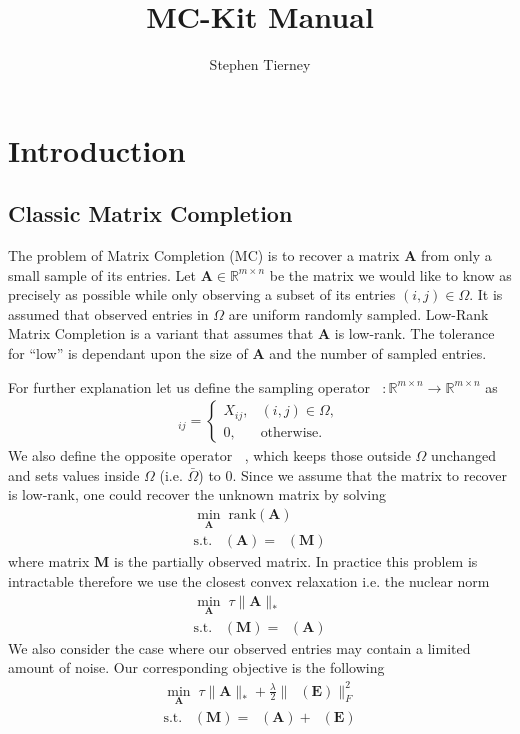 \documentclass{article}
\DeclareMathOperator*{\pro}{\mathcal P_{\Omega}}
\DeclareMathOperator*{\pron}{\mathcal P_{\bar{\Omega}}}
\begin{document}
\title{MC-Kit Manual}
\author{Stephen Tierney}
\maketitle

\section{Introduction}
\subsection{Classic Matrix Completion}

The problem of Matrix Completion (MC) is to recover a matrix $\mathbf A$ from only a small sample of its entries. Let $\mathbf A \in \mathbb R^{m \times n}$  be the matrix we would like to know as precisely as possible while only observing a subset of its entries $(i, j) \in \Omega$. It is assumed that observed entries in $\Omega$ are uniform randomly sampled. Low-Rank Matrix Completion is a variant that assumes that $\mathbf A$ is low-rank. The tolerance for ``low'' is dependant upon the size of $\mathbf A$ and the number of sampled entries. 

For further explanation let us define the sampling operator $\pro : \mathbb R^{m \times n} \rightarrow \mathbb R^{m \times n}$ as
\begin{align}
[ \pro  ( X ) ]_{ij} = \left\{
\begin{array}{ll}
X_{ij}, &(i, j) \in \Omega,\\
0, &\text{otherwise}.
\end{array}
\right.
\end{align}
We also define the opposite operator $\pron$, which keeps those outside $\Omega$ unchanged and sets values inside $\Omega$ (i.e. $\bar{\Omega}$) to $0$. Since we assume that the matrix to recover is low-rank, one could recover the unknown matrix by solving
\begin{align}
\min_{\mathbf A} \; \text{rank}(\mathbf A)\\
\text{s.t.} \; \pro  (\mathbf A) = \pro (\mathbf M) \nonumber 
\end{align}
where matrix $\mathbf M$ is the partially observed matrix. In practice this problem is intractable therefore we use the closest convex relaxation i.e. the nuclear norm
\begin{align}
\min_{\mathbf A} \; \tau \| \mathbf A \|_* \\
\text{s.t.} \; \pro (\mathbf M) = \pro (\mathbf A) \nonumber
\label{classic_objective}
\end{align}
We also consider the case where our observed entries may contain a limited amount of noise. Our corresponding objective is the following
\begin{align}
\min_{\mathbf A} \; \tau \| \mathbf A \|_* + \frac{\lambda}{2} \| \pro (\mathbf E) \|_F^2\\
\text{s.t.} \; \pro (\mathbf M) = \pro (\mathbf A) + \pro (\mathbf E) \nonumber 
\end{align}
\end{document}
